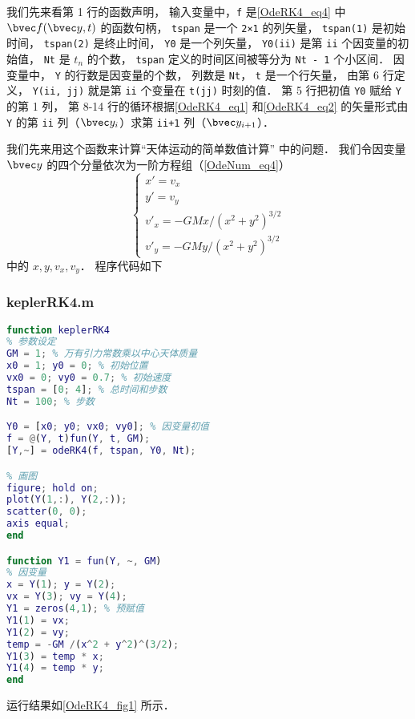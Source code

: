 我们先来看第 1 行的函数声明， 输入变量中，\verb|f| 是\autoref{OdeRK4_eq4} 中 $\bvec f(\bvec y, t)$ 的函数句柄， \verb|tspan| 是一个 \verb|2×1| 的列矢量， \verb|tspan(1)| 是初始时间， \verb|tspan(2)| 是终止时间， \verb|Y0| 是一个列矢量， \verb|Y0(ii)| 是第 \verb|ii| 个因变量的初始值， \verb|Nt| 是 $t_n$ 的个数， \verb|tspan| 定义的时间区间被等分为 \verb|Nt - 1| 个小区间． 因变量中， \verb|Y| 的行数是因变量的个数， 列数是 \verb|Nt|， \verb|t| 是一个行矢量， 由第 6 行定义， \verb|Y(ii, jj)| 就是第 \verb|ii| 个变量在 \verb|t(jj)| 时刻的值． 第 5 行把初值 \verb|Y0| 赋给 \verb|Y| 的第 1 列， 第 8-14 行的循环根据\autoref{OdeRK4_eq1} 和\autoref{OdeRK4_eq2} 的矢量形式由 \verb|Y| 的第 \verb|ii| 列（$\bvec y_i$）求第 \verb|ii+1| 列（$\bvec y_{i+1}$）．

我们先来用这个函数来计算“天体运动的简单数值计算” 中的问题． 我们令因变量 $\bvec y$ 的四个分量依次为一阶方程组（\autoref{OdeNum_eq4}）
\begin{equation}\label{OdeRK4_eq5}
\begin{cases}
x' = v_x\\
y' = v_y\\
v'_x = -GMx/(x^2 + y^2)^{3/2}\\
v'_y = -GMy/(x^2 + y^2)^{3/2}
\end{cases}
\end{equation}
中的 $x, y, v_x, v_y$． 程序代码如下

\subsubsection{keplerRK4.m}
\begin{lstlisting}[language=matlab]
function keplerRK4
% 参数设定
GM = 1; % 万有引力常数乘以中心天体质量
x0 = 1; y0 = 0; % 初始位置
vx0 = 0; vy0 = 0.7; % 初始速度
tspan = [0; 4]; % 总时间和步数
Nt = 100; % 步数

Y0 = [x0; y0; vx0; vy0]; % 因变量初值
f = @(Y, t)fun(Y, t, GM);
[Y,~] = odeRK4(f, tspan, Y0, Nt);

% 画图
figure; hold on;
plot(Y(1,:), Y(2,:));
scatter(0, 0);
axis equal;
end

function Y1 = fun(Y, ~, GM)
% 因变量
x = Y(1); y = Y(2);
vx = Y(3); vy = Y(4);
Y1 = zeros(4,1); % 预赋值
Y1(1) = vx;
Y1(2) = vy;
temp = -GM /(x^2 + y^2)^(3/2);
Y1(3) = temp * x;
Y1(4) = temp * y;
end
\end{lstlisting}

运行结果如\autoref{OdeRK4_fig1} 所示．

